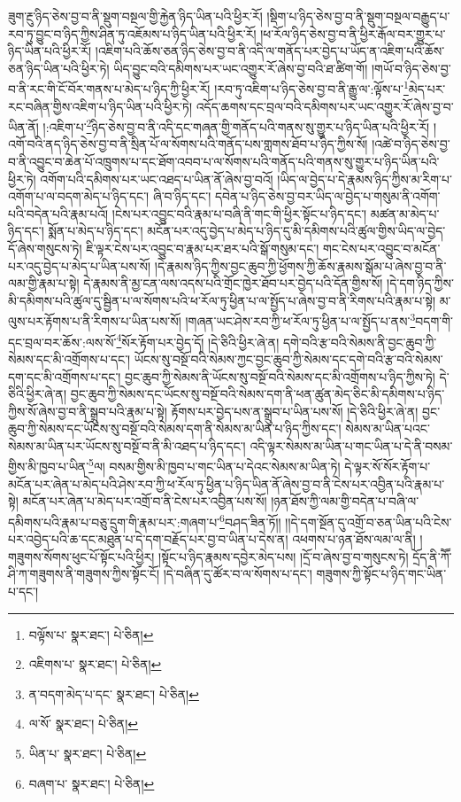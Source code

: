 ཟུག་རྔུ་ཉིད་ཅེས་བྱ་བ་ནི་སྡུག་བསྔལ་གྱི་རྐྱེན་ཉིད་ཡིན་པའི་ཕྱིར་རོ། །སྡིག་པ་ཉིད་ཅེས་བྱ་བ་ནི་སྡུག་བསྔལ་བརྒྱུད་པ་རབ་ཏུ་བྱུང་བ་ཉིད་ཀྱིས་ཤིན་ཏུ་འཇོམས་པ་ཉིད་ཡིན་པའི་ཕྱིར་རོ། །ཕ་རོལ་ཉིད་ཅེས་བྱ་བ་ནི་ཕྱིར་རྒོལ་བར་གྱུར་པ་ཉིད་ཡིན་པའི་ཕྱིར་རོ། །འཇིག་པའི་ཆོས་ཅན་ཉིད་ཅེས་བྱ་བ་ནི་འདི་ལ་གནོད་པར་བྱེད་པ་ཡོད་ན་འཇིག་པའི་ཆོས་ཅན་ཉིད་ཡིན་པའི་ཕྱིར་ཏེ། ཡིད་བྱུང་བའི་དམིགས་པར་ཡང་འགྱུར་རོ་ཞེས་བྱ་བའི་ཐ་ཚིག་གོ། །གཡོ་བ་ཉིད་ཅེས་བྱ་བ་ནི་རང་གི་ངོ་བོར་གནས་པ་མེད་པ་ཉིད་ཀྱི་ཕྱིར་རོ། །རབ་ཏུ་འཇིག་པ་ཉིད་ཅེས་བྱ་བ་ནི་རྒྱུ་ལ་:ལྟོས་པ་\footnote{བལྟོས་པ་  སྣར་ཐང་།  པེ་ཅིན། }མེད་པར་རང་བཞིན་གྱིས་འཇིག་པ་ཉིད་ཡིན་པའི་ཕྱིར་ཏེ། འདོད་ཆགས་དང་བྲལ་བའི་དམིགས་པར་ཡང་འགྱུར་རོ་ཞེས་བྱ་བ་ཡིན་ནོ། །:འཇིག་པ་\footnote{འཇིགས་པ་  སྣར་ཐང་།  པེ་ཅིན། }ཉིད་ཅེས་བྱ་བ་ནི་འདི་དང་གཞན་གྱི་གནོད་པའི་གནས་སུ་གྱུར་པ་ཉིད་ཡིན་པའི་ཕྱིར་རོ། །འགོ་བའི་ནད་ཉིད་ཅེས་བྱ་བ་ནི་སྲིན་པོ་ལ་སོགས་པའི་གནོད་པས་གླགས་ཐོབ་པ་ཉིད་ཀྱིས་སོ། །འཚེ་བ་ཉིད་ཅེས་བྱ་བ་ནི་འབྱུང་བ་ཆེན་པོ་འཁྲུགས་པ་དང་ཐོག་འབབ་པ་ལ་སོགས་པའི་གནོད་པའི་གནས་སུ་གྱུར་པ་ཉིད་ཡིན་པའི་ཕྱིར་ཏེ། འགོག་པའི་དམིགས་པར་ཡང་འཐད་པ་ཡིན་ནོ་ཞེས་བྱ་བའོ། །ཡིད་ལ་བྱེད་པ་དེ་རྣམས་ཉིད་ཀྱིས་མ་རིག་པ་འགོག་པ་ལ་བདག་མེད་པ་ཉིད་དང་། ཞི་བ་ཉིད་དང་། དབེན་པ་ཉིད་ཅེས་བྱ་བར་ཡིད་ལ་བྱེད་པ་གསུམ་ནི་འགོག་པའི་བདེན་པའི་རྣམ་པའོ། །ངེས་པར་འབྱུང་བའི་རྣམ་པ་བཞི་ནི་གང་གི་ཕྱིར་སྟོང་པ་ཉིད་དང་། མཚན་མ་མེད་པ་ཉིད་དང་། སྨོན་པ་མེད་པ་ཉིད་དང་། མངོན་པར་འདུ་བྱེད་པ་མེད་པ་ཉིད་དུ་མི་དམིགས་པའི་ཚུལ་གྱིས་ཡིད་ལ་བྱེད་དོ་ཞེས་གསུངས་ཏེ། ཇི་ལྟར་ངེས་པར་འབྱུང་བ་རྣམ་པར་ཐར་པའི་སྒོ་གསུམ་དང་། གང་ངེས་པར་འབྱུང་བ་མངོན་པར་འདུ་བྱེད་པ་མེད་པ་ཡིན་པས་སོ། །དེ་རྣམས་ཉིད་ཀྱིས་བྱང་ཆུབ་ཀྱི་ཕྱོགས་ཀྱི་ཆོས་རྣམས་སྒོམ་པ་ཞེས་བྱ་བ་ནི་ལམ་གྱི་རྣམ་པ་སྟེ། དེ་རྣམས་ནི་མྱ་ངན་ལས་འདས་པའི་གྲོང་ཁྱེར་ཐོབ་པར་བྱེད་པའི་དོན་གྱིས་སོ། །དེ་དག་ཉིད་ཀྱིས་མི་དམིགས་པའི་ཚུལ་དུ་སྦྱིན་པ་ལ་སོགས་པའི་ཕ་རོལ་ཏུ་ཕྱིན་པ་ལ་སྤྱོད་པ་ཞེས་བྱ་བ་ནི་རིགས་པའི་རྣམ་པ་སྟེ། མ་ལུས་པར་རྟོགས་པ་ནི་རིགས་པ་ཡིན་པས་སོ། །གཞན་ཡང་ཤེས་རབ་ཀྱི་ཕ་རོལ་ཏུ་ཕྱིན་པ་ལ་སྤྱོད་པ་ནས་\footnote{ན་བདག་མེད་པ་དང་  སྣར་ཐང་།  པེ་ཅིན། }བདག་གི་དང་བྲལ་བར་ཆོས་:ལས་སོ་\footnote{ལ་སོ་  སྣར་ཐང་།  པེ་ཅིན། }སོར་རྟོག་པར་བྱེད་དོ། །དེ་ཅིའི་ཕྱིར་ཞེ་ན། དགེ་བའི་རྩ་བའི་སེམས་ནི་བྱང་ཆུབ་ཀྱི་སེམས་དང་མི་འགྲོགས་པ་དང་། ཡོངས་སུ་བསྔོ་བའི་སེམས་ཀྱང་བྱང་ཆུབ་ཀྱི་སེམས་དང་དགེ་བའི་རྩ་བའི་སེམས་དག་དང་མི་འགྲོགས་པ་དང་། བྱང་ཆུབ་ཀྱི་སེམས་ནི་ཡོངས་སུ་བསྔོ་བའི་སེམས་དང་མི་འགྲོགས་པ་ཉིད་ཀྱིས་ཏེ། དེ་ཅིའི་ཕྱིར་ཞེ་ན། བྱང་ཆུབ་ཀྱི་སེམས་དང་ཡོངས་སུ་བསྔོ་བའི་སེམས་དག་ནི་ཕན་ཚུན་མེད་ཅིང་མི་དམིགས་པ་ཉིད་ཀྱིས་སོ་ཞེས་བྱ་བ་ནི་སྒྲུབ་པའི་རྣམ་པ་སྟེ། རྟོགས་པར་བྱེད་པས་ན་སྒྲུབ་པ་ཡིན་པས་སོ། །དེ་ཅིའི་ཕྱིར་ཞེ་ན། བྱང་ཆུབ་ཀྱི་སེམས་དང་ཡོངས་སུ་བསྔོ་བའི་སེམས་དག་ནི་སེམས་མ་ཡིན་པ་ཉིད་ཀྱིས་དང་། སེམས་མ་ཡིན་པའང་སེམས་མ་ཡིན་པར་ཡོངས་སུ་བསྔོ་བ་ནི་མི་འཐད་པ་ཉིད་དང་། འདི་ལྟར་སེམས་མ་ཡིན་པ་གང་ཡིན་པ་དེ་ནི་བསམ་གྱིས་མི་ཁྱབ་པ་ཡིན་\footnote{ཡིན་པ་  སྣར་ཐང་།  པེ་ཅིན། }ལ། བསམ་གྱིས་མི་ཁྱབ་པ་གང་ཡིན་པ་དེའང་སེམས་མ་ཡིན་ཏེ། དེ་ལྟར་སོ་སོར་རྟོག་པ་མངོན་པར་ཞེན་པ་མེད་པའི་ཤེས་རབ་ཀྱི་ཕ་རོལ་ཏུ་ཕྱིན་པ་ཉིད་ཡིན་ནོ་ཞེས་བྱ་བ་ནི་ངེས་པར་འབྱིན་པའི་རྣམ་པ་སྟེ། མངོན་པར་ཞེན་པ་མེད་པར་འགྲོ་བ་ནི་ངེས་པར་འབྱིན་པས་སོ། །ཉན་ཐོས་ཀྱི་ལམ་གྱི་བདེན་པ་བཞི་ལ་དམིགས་པའི་རྣམ་པ་བཅུ་དྲུག་གི་རྣམ་པར་:གཞག་པ་\footnote{བཞག་པ་  སྣར་ཐང་།  པེ་ཅིན། }བཤད་ཟིན་ཏོ།། །།དེ་དག་སྔོན་དུ་འགྲོ་བ་ཅན་ཡིན་པའི་ངེས་པར་འབྱེད་པའི་ཆ་དང་མཐུན་པ་དེ་དག་བརྗོད་པར་བྱ་བ་ཡིན་པ་དེས་ན། འཕགས་པ་ཉན་ཐོས་ལམ་ལ་ནི། །གཟུགས་སོགས་ཕུང་པོ་སྟོང་པའི་ཕྱིར། །སྟོང་པ་ཉིད་རྣམས་དབྱེར་མེད་པས། །དྲོ་བ་ཞེས་བྱ་བ་གསུངས་ཏེ། དྲོད་ནི་ཀཽ་ཤི་ཀ་གཟུགས་ནི་གཟུགས་ཀྱིས་སྟོང་ངོ། །དེ་བཞིན་དུ་ཚོར་བ་ལ་སོགས་པ་དང་། གཟུགས་ཀྱི་སྟོང་པ་ཉིད་གང་ཡིན་པ་དང་། 